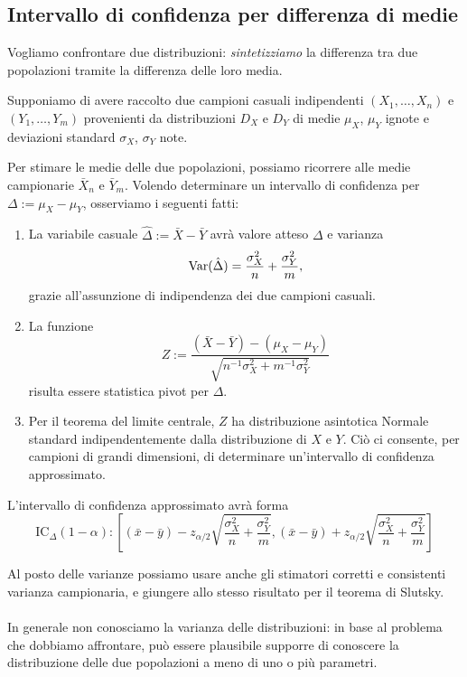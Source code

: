 \subsection{Intervallo di confidenza per differenza di medie}

Vogliamo confrontare due distribuzioni: \textit{sintetizziamo} la differenza tra due popolazioni tramite la differenza delle loro media.

Supponiamo di avere raccolto due campioni casuali indipendenti
\((X_1,\dotsc,X_n)\) e \((Y_1,\dotsc,Y_m)\) provenienti da distribuzioni \(D_X\) e \(D_Y\) di medie \(\mu_X\), \(\mu_Y\) ignote e deviazioni standard \(\sigma_X\), \(\sigma_Y\) note.

Per stimare le medie delle due popolazioni, possiamo ricorrere alle medie campionarie \(\bar{X}_n\) e \(\bar{Y}_m\). Volendo determinare un intervallo di confidenza per \(\Delta := \mu_X - \mu_Y\), osserviamo i seguenti fatti:
\begin{enumerate}
  \item La variabile casuale \(\hat{\Delta} := \bar{X} - \bar{Y}\) avrà valore atteso \(\Delta\) e varianza
  \begin{equation*}
    \operatorname{Var}(\hat{\Delta}) = \frac{\sigma_X^2}{n} + \frac{\sigma_Y^2}{m},
  \end{equation*}
  grazie all'assunzione di indipendenza dei due campioni casuali.
  \item La funzione
  \begin{equation*}
    Z := \frac{(\bar{X}-\bar{Y}) - (\mu_X - \mu_Y)}{\sqrt{n^{-1}\sigma_X^2+m^{-1}\sigma_Y^2}}
  \end{equation*}
  risulta essere statistica pivot per \(\Delta\).
  \item Per il teorema del limite centrale, \(Z\) ha distribuzione asintotica Normale standard indipendentemente dalla distribuzione di \(X\) e \(Y\). Ciò ci consente, per campioni di grandi dimensioni, di determinare un'intervallo di confidenza approssimato.
\end{enumerate}
L'intervallo di confidenza approssimato avrà forma
\begin{equation}
  \mathrm{IC}_{\Delta}(1-\alpha) \colon
  \left[(\bar{x} - \bar{y}) - z_{\alpha/2} \sqrt{ \frac{\sigma_X^2}{n} + \frac{\sigma_Y^2}{m}},(\bar{x} - \bar{y}) + z_{\alpha/2} \sqrt{ \frac{\sigma_X^2}{n} + \frac{\sigma_Y^2}{m}}\right]
\end{equation}

Al posto delle varianze possiamo usare anche gli stimatori corretti e consistenti varianza campionaria, e giungere allo stesso risultato per il teorema di Slutsky.
\\ \\
In generale non conosciamo la varianza delle distribuzioni: in base al problema che dobbiamo affrontare, può essere plausibile supporre di conoscere la distribuzione delle due popolazioni a meno di uno o più parametri.

